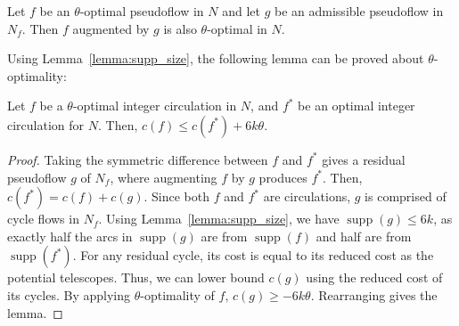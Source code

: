 \documentclass[11pt]{article}
\def\arcto{\mathord\shortrightarrow}
\def\arc#1#2{#1\arcto#2}
\def\cost{c}
\def\supp{\operatorname{supp}}
\theoremstyle{plain}
\numberwithin{figure}{section}
\begin{document}
\begin{lemma}
\label{lemma:eps_opt_preserve}
Let $f$ be an $\theta$-optimal pseudoflow in $N$ and let $g$ be an admissible
pseudoflow in $N_f$.
Then $f$ augmented by $g$ is also $\theta$-optimal in $N$.
\end{lemma}

%

Using Lemma~\ref{lemma:supp_size}, the following lemma can be proved about
$\theta$-optimality:

\begin{lemma}
\label{lemma:goldberg_cost_add}
Let $f$ be a $\theta$-optimal integer circulation in $N$,
and $f^*$ be an optimal integer circulation for $N$.
Then, $\cost(f) \leq \cost(f^*) + 6k\theta$.
\end{lemma}
\begin{proof}
Taking the symmetric difference between $f$ and $f^*$ gives a residual pseudoflow $g$ of $N_f$,
where augmenting $f$ by $g$ produces $f^*$.
Then, $\cost(f^*) = \cost(f) + \cost(g)$.
Since both $f$ and $f^*$ are circulations, $g$ is comprised of cycle flows in $N_f$.
Using Lemma~\ref{lemma:supp_size}, we have $\supp(g) \leq 6k$, as exactly half
the arcs in $\supp(g)$ are from $\supp(f)$ and half are from $\supp(f^*)$.
For any residual cycle, its cost is equal to its reduced cost as the potential telescopes.
Thus, we can lower bound $\cost(g)$ using the reduced cost of its cycles.
By applying $\theta$-optimality of $f$, $\cost(g) \geq -6k\theta$.
Rearranging gives the lemma.
\end{proof}
\end{document}
